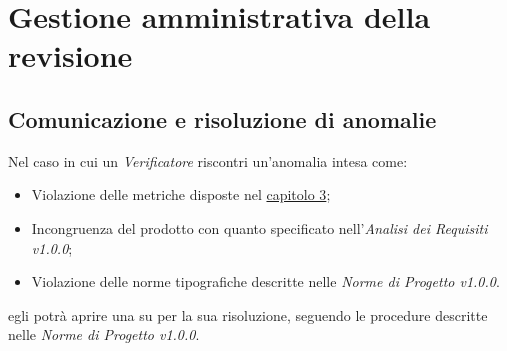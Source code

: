 \chapter{Gestione amministrativa della revisione}
\section{Comunicazione e risoluzione di anomalie}

Nel caso in cui un \textit{Verificatore} riscontri un'anomalia intesa come:

\begin{itemize}
	\item Violazione delle metriche disposte nel \hyperref[Metriche]{capitolo 3};
	\item Incongruenza del prodotto con quanto specificato nell'\textit{Analisi dei Requisiti v1.0.0};
	\item Violazione delle norme tipografiche descritte nelle \textit{Norme di Progetto v1.0.0}.
\end{itemize}

egli potrà aprire una  su  per la sua risoluzione, seguendo le procedure descritte nelle \textit{Norme di Progetto v1.0.0}.


